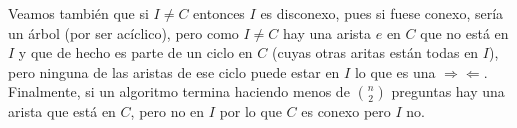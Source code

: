 \documentclass[dcc,uchile]{fcfmcourse}
\theoremstyle{plain}
\theoremstyle{definition}
\begin{document}
\begin{problems}
Veamos también que si $I\not = C$ entonces $I$ es disconexo, pues si fuese conexo, sería un árbol (por ser acíclico), pero como $I\not = C$ hay una arista $e$ en $C$ que no está en $I$ y que de hecho es parte de un ciclo en $C$ (cuyas otras aritas están todas en $I$), pero ninguna de las aristas de ese ciclo puede estar en $I$ lo que es una $\Rightarrow \Leftarrow$.\\

Finalmente, si un algoritmo termina haciendo menos de $\binom{n}{2}$ preguntas hay una arista que está en $C$, pero no en $I$ por lo que $C$ es conexo pero $I$ no.
\end{problems}
\end{document}

